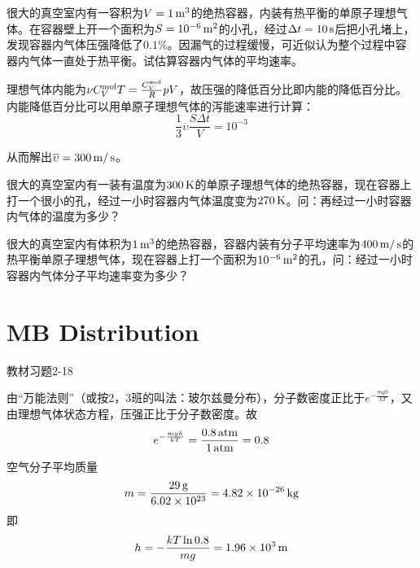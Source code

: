 \documentclass[CJK]{beamer}
\begin{document}
\begin{frame}
\bch
{\blue \small 很大的真空室内有一容积为$V=1\,\mathrm{m}^3$的绝热容器，内装有热平衡的单原子理想气体。在容器壁上开一个面积为$S=10^{-6}\,\mathrm{m}^2$的小孔，经过$\Delta t = 10\,\mathrm{s}$后把小孔堵上，发现容器内气体压强降低了$0.1\%$。因漏气的过程缓慢，可近似认为整个过程中容器内气体一直处于热平衡。试估算容器内气体的平均速率。}

\skipline

{\small

理想气体内能为$\nu C_V^{\rm mol} T = \frac{C_V^{\rm mol}}{R} pV$，故压强的降低百分比即内能的降低百分比。内能降低百分比可以用单原子理想气体的泻能速率进行计算：
$$\frac{1}{3}\overline{\upsilon} \frac{S\Delta t}{V} = 10^{-3}$$

从而解出$\overline{\upsilon} = 300\,\mathrm{m}/\,\mathrm{s}$。
}
\ech
\end{frame}


\begin{frame}
\bch
{}

很大的真空室内有一装有温度为$300\,\mathrm{K}$的单原子理想气体的绝热容器，现在容器上打一个很小的孔，经过一小时容器内气体温度变为$270\,\mathrm{K}$。问：再经过一小时容器内气体的温度为多少？
\ech
\end{frame}



\begin{frame}
\bch
{}

很大的真空室内有体积为$1\,\mathrm{m}^3$的绝热容器，容器内装有分子平均速率为$400\,\mathrm{m}/\,\mathrm{s}$的热平衡单原子理想气体，现在容器上打一个面积为$10^{-6}\,\mathrm{m}^2$的孔，问：经过一小时容器内气体分子平均速率变为多少？
\ech
\end{frame}


\section{MB Distribution}

\begin{frame}
\bch
{\blue 教材习题2-18}

\skipline

{\scriptsize
由“万能法则”（或按2，3班的叫法：玻尔兹曼分布），分子数密度正比于$e^{-\frac{mgh}{kT}}$，又由理想气体状态方程，压强正比于分子数密度。故
$$ e^{-\frac{mgh}{kT}} = \frac{0.8\,\mathrm{atm}}{1\,\mathrm{atm}} = 0.8$$
空气分子平均质量
$$m = \frac{29\,\mathrm{g}}{6.02\times 10^{23}} = 4.82\times 10^{-26}\,\mathrm{kg}$$
即
$$h = -\frac{kT\ln 0.8}{mg} = 1.96\times 10^3 \,\mathrm{m}$$ 
}
\ech
\end{frame}
\end{document}
